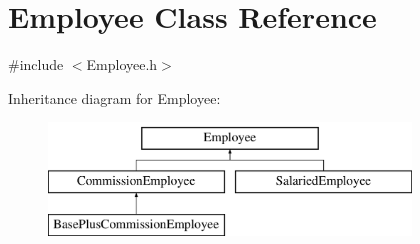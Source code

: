 \hypertarget{class_employee}{}\section{Employee Class Reference}
\label{class_employee}


{\ttfamily \#include $<$Employee.\+h$>$}

Inheritance diagram for Employee\+:\begin{figure}[H]
\begin{center}
\leavevmode
\includegraphics[height=3.000000cm]{class_employee}
\end{center}
\end{figure}
